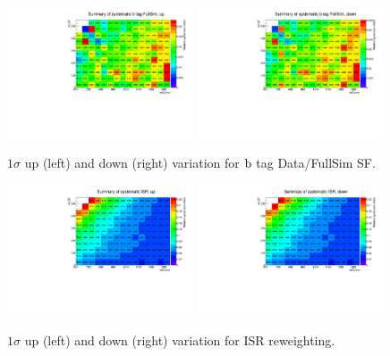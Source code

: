 \begin{figure}[htpb]
\includegraphics[width=0.49\textwidth]{figures/app_sig_syst/sys_b-tag-FullSim_up}
\includegraphics[width=0.49\textwidth]{figures/app_sig_syst/sys_b-tag-FullSim_down}
\caption{$1\sigma$ up (left) and down (right) variation for $\mathrm{b}$ tag Data/FullSim SF.}
\end{figure}

\begin{figure}[htpb]
\includegraphics[width=0.49\textwidth]{figures/app_sig_syst/sys_ISR_up}
\includegraphics[width=0.49\textwidth]{figures/app_sig_syst/sys_ISR_down}
\caption{$1\sigma$ up (left) and down (right) variation for ISR reweighting.}
\end{figure}

